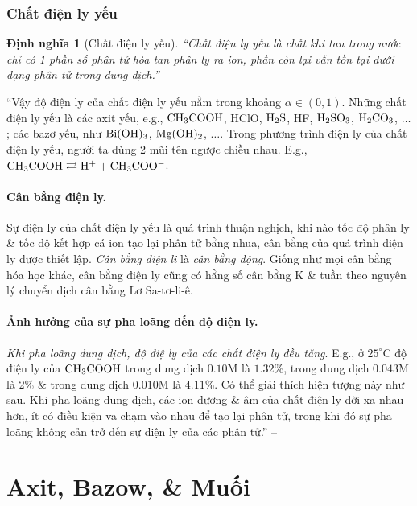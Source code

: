 \documentclass[oneside]{book}
\numberwithin{equation}{section}
\newtheorem{dinhnghia}{Định nghĩa}[section]
\begin{document}
\subsubsection{Chất điện ly yếu}

\begin{dinhnghia}[Chất điện ly yếu]
	``\emph{Chất điện ly yếu} là chất khi tan trong nước chỉ có 1 phần số phân tử hòa tan phân ly ra ion, phần còn lại vẫn tồn tại dưới dạng phân tử trong dung dịch.'' -- \cite[p. 9]{SGK_Hoa_Hoc_11_nang_cao}
\end{dinhnghia}
``Vậy độ điện ly của chất điện ly yếu nằm trong khoảng $\alpha\in(0,1)$. Những chất điện ly yếu là các axit yếu, e.g., $\rm CH_3COOH$, HClO, $\rm H_2S$, HF, $\rm H_2SO_3$, $\rm H_2CO_3$, $\ldots$; các bazơ yếu, như $\rm Bi(OH)_3$, $\rm Mg(OH)_2$, $\ldots$. Trong phương trình điện ly của chất điện ly yếu, người ta dùng 2 mũi tên ngược chiều nhau. E.g., $\rm CH_3COOH\rightleftarrows H^+ + CH_3COO^-$.

\paragraph{Cân bằng điện ly.} Sự điện ly của chất điện ly yếu là quá trình thuận nghịch, khi nào tốc độ phân ly \& tốc độ kết hợp cá ion tạo lại phân tử bằng nhua, cân bằng của quá trình điện ly được thiết lập. \textit{Cân bằng điện li} là \textit{cân bằng động}. Giống như mọi cân bằng hóa học khác, cân bằng điện ly cũng có hằng số cân bằng K \& tuần theo nguyên lý chuyển dịch cân bằng Lơ Sa-tơ-li-ê.

\paragraph{Ảnh hưởng của sự pha loãng đến độ điện ly.} \textit{Khi pha loãng dung dịch, độ điệ ly của các chất điện ly đều tăng}. E.g., ở $25^\circ$C độ điện ly của $\rm CH_3COOH$ trong dung dịch $0.10$M là $1.32$\%, trong dung dịch $0.043$M là 2\% \& trong dung dịch $0.010$M là $4.11$\%. Có thể giải thích hiện tượng này như sau. Khi pha loãng dung dịch, các ion dương \& âm của chất điện ly dời xa nhau hơn, ít có điều kiện va chạm vào nhau để tạo lại phân tử, trong khi đó sự pha loãng không cản trở đến sự điện ly của các phân tử.'' -- \cite[pp. 9--10]{SGK_Hoa_Hoc_11_nang_cao}


\section{Axit, Bazow, \& Muối}
\end{document}
